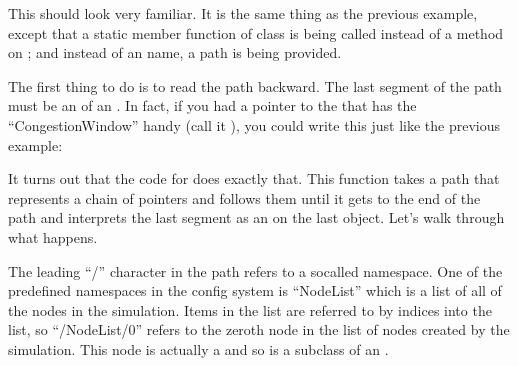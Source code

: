 \documentclass[letterpaper,10pt,english]{sphinxmanual}
\renewcommand{\sphinxcode}[1]{\texttt{\small{#1}}}
\begin{document}
This should look very familiar. It is the same thing as the previous example,
except that a static member function of class \sphinxcode{} is being called instead
of a method on \sphinxcode{}; and instead of an \sphinxcode{} name, a path is being
provided.

The first thing to do is to read the path backward. The last segment of the path
must be an \sphinxcode{} of an \sphinxcode{}. In fact, if you had a pointer to the
\sphinxcode{} that has the “CongestionWindow” \sphinxcode{} handy (call it
\sphinxcode{}), you could write this just like the previous example:

\begin{sphinxVerbatim}[commandchars=\\\{\}]
      


   
\end{sphinxVerbatim}

It turns out that the code for \sphinxcode{} does exactly
that. This function takes a path that represents a chain of \sphinxcode{} pointers
and follows them until it gets to the end of the path and interprets the last
segment as an \sphinxcode{} on the last object. Let’s walk through what
happens.

The leading “/” character in the path refers to a so\sphinxhyphen{}called namespace. One of the
predefined namespaces in the config system is “NodeList” which is a list of all of
the nodes in the simulation. Items in the list are referred to by indices into the
list, so “/NodeList/0” refers to the zeroth node in the list of nodes created by
the simulation. This node is actually a \sphinxcode{} and so is a subclass of
an \sphinxcode{}.
\end{document}
